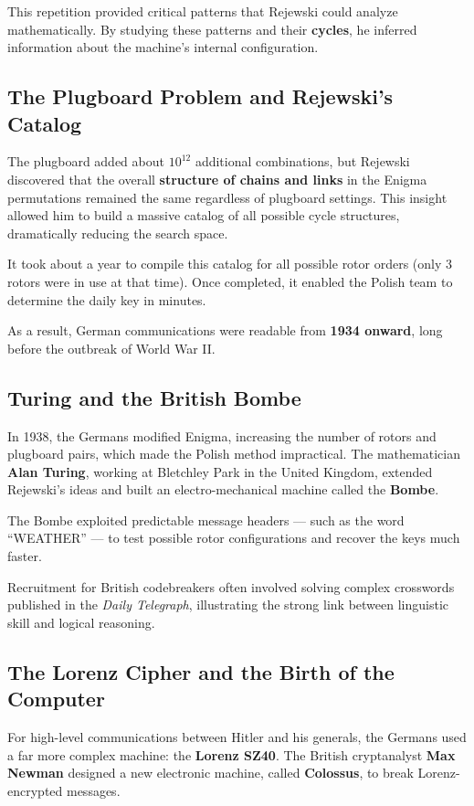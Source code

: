 This repetition provided critical patterns that Rejewski could analyze mathematically.  
By studying these patterns and their \textbf{cycles}, he inferred information about the machine’s internal configuration.

\subsection{The Plugboard Problem and Rejewski’s Catalog}

The plugboard added about $10^{12}$ additional combinations, but Rejewski discovered that the overall \textbf{structure of chains and links} in the Enigma permutations remained the same regardless of plugboard settings.  
This insight allowed him to build a massive catalog of all possible cycle structures, dramatically reducing the search space.

It took about a year to compile this catalog for all possible rotor orders (only 3 rotors were in use at that time).  
Once completed, it enabled the Polish team to determine the daily key in minutes.

As a result, German communications were readable from \textbf{1934 onward}, long before the outbreak of World War II.

\subsection{Turing and the British Bombe}

In 1938, the Germans modified Enigma, increasing the number of rotors and plugboard pairs, which made the Polish method impractical.  
The mathematician \textbf{Alan Turing}, working at Bletchley Park in the United Kingdom, extended Rejewski’s ideas and built an electro-mechanical machine called the \textbf{Bombe}.

The Bombe exploited predictable message headers — such as the word “WEATHER” — to test possible rotor configurations and recover the keys much faster.

Recruitment for British codebreakers often involved solving complex crosswords published in the \textit{Daily Telegraph}, illustrating the strong link between linguistic skill and logical reasoning.

\subsection{The Lorenz Cipher and the Birth of the Computer}

For high-level communications between Hitler and his generals, the Germans used a far more complex machine: the \textbf{Lorenz SZ40}.  
The British cryptanalyst \textbf{Max Newman} designed a new electronic machine, called \textbf{Colossus}, to break Lorenz-encrypted messages.

